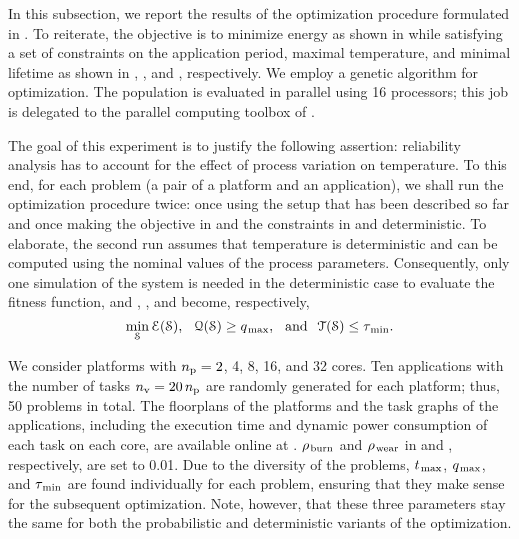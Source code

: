 In this subsection, we report the results of the optimization procedure formulated in .
To reiterate, the objective is to minimize energy as shown in  while satisfying a set of constraints on the application period, maximal temperature, and minimal lifetime as shown in , , and , respectively.
We employ a genetic algorithm for optimization.
The population is evaluated in parallel using 16 processors; this job is delegated to the parallel computing toolbox of  \cite{matlab}.

The goal of this experiment is to justify the following assertion: reliability analysis has to account for the effect of process variation on temperature.
To this end, for each problem (a pair of a platform and an application), we shall run the optimization procedure twice: once using the setup that has been described so far and once making the objective in  and the constraints in  and  deterministic.
To elaborate, the second run assumes that temperature is deterministic and can be computed using the nominal values of the process parameters.
Consequently, only one simulation of the system is needed in the deterministic case to evaluate the fitness function, and , , and  become, respectively,
\[
  \min_{\EuScript{S}} \EuScript{E}(\EuScript{S}), \hspace{0.7em} \EuScript{Q}(\EuScript{S}) \geq q_{\text{\kern0.1emmax}}, \hspace{0.7em} \text{and} \hspace{0.7em} \EuScript{T}(\EuScript{S}) \leq \tau_{\text{\kern0.1emmin}}.
\]


We consider platforms with ${n_\text{p}} = 2$, 4, 8, 16, and 32 cores.
Ten applications with the number of tasks ${n_\text{v}} = 20 \, {n_\text{p}}$ are randomly generated for each platform; thus, 50 problems in total.
The floorplans of the platforms and the task graphs of the applications, including the execution time and dynamic power consumption of each task on each core, are available online at \cite{sources}.
$\rho_{\text{\kern0.1emburn}}$ and $\rho_{\text{\kern0.1emwear}}$ in  and , respectively, are set to 0.01.
Due to the diversity of the problems, $t_{\text{\kern0.1emmax}}$, $q_{\text{\kern0.1emmax}}$, and $\tau_{\text{\kern0.1emmin}}$ are found individually for each problem, ensuring that they make sense for the subsequent optimization.
Note, however, that these three parameters stay the same for both the probabilistic and deterministic variants of the optimization.


